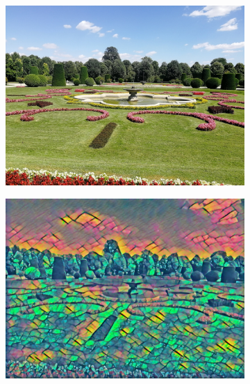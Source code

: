 \begin{figure}[H]
    \begin{subfigure}[h]{0.32\textwidth}
        \centering
        \includegraphics[width=\textwidth]{resources/content/content/garden.jpg}
    \end{subfigure}
    \begin{subfigure}[h]{0.32\textwidth}
        \centering
        \includegraphics[width=\textwidth]{resources/content/experiments/garden-vgg16_crystal_glass_on_a_colorful_background.jpg}
    \end{subfigure}
    \begin{subfigure}[h]{0.32\textwidth}
        \centering

\end{subfigure}
\end{figure}
